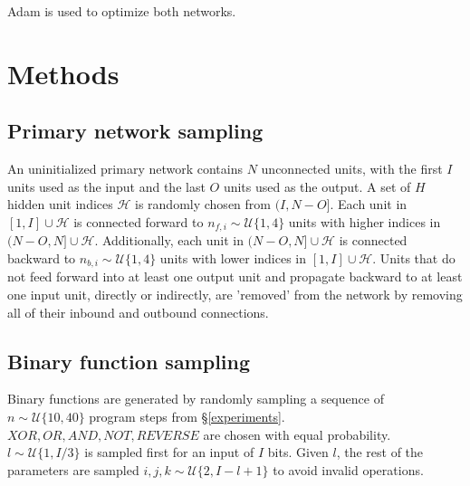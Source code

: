 \documentclass{article}[12px]
\begin{document}
Adam \cite{DBLP:journals/corr/KingmaB14} is used to optimize both networks.

{}


\pagebreak

\appendix
\section{Methods}

\subsection{Primary network sampling}

An uninitialized primary network contains \(N\) unconnected units, with the first \(I\) units used as the input and the last \(O\) units used as the output. A set of \(H\) hidden unit indices \(\mathcal{H}\) is randomly chosen from \((I, N - O]\). Each unit in \([1, I] \cup \mathcal{H}\) is connected forward to \(n_{f, i} \sim \mathcal{U}\{1, 4\}\) units with higher indices in \((N - O, N] \cup \mathcal{H}\). Additionally, each unit in \((N - O, N] \cup \mathcal{H}\) is connected backward to \(n_{b,i} \sim \mathcal{U}\{1, 4\}\) units with lower indices in \([1, I] \cup \mathcal{H}\). Units that do not feed forward into at least one output unit and propagate backward to at least one input unit, directly or indirectly, are 'removed' from the network by removing all of their inbound and outbound connections.

\subsection{Binary function sampling}

Binary functions are generated by randomly sampling a sequence of \(n \sim \mathcal{U}\{10, 40\}\) program steps from \S \ref{experiments}. \(XOR, OR, AND, NOT, REVERSE\) are chosen with equal probability. \(l \sim \mathcal{U}\{1, {I/3}\}\) is sampled first for an input of \(I\) bits. Given \(l\), the rest of the parameters are sampled \(i, j, k \sim \mathcal{U}\{2, I-l+1\}\) to avoid invalid operations.
\end{document}
